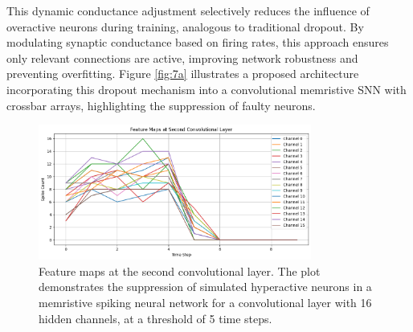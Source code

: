 
\noindent This dynamic conductance adjustment selectively reduces the influence of overactive neurons during training, analogous to traditional dropout. By modulating synaptic conductance based on firing rates, this approach ensures only relevant connections are active, improving network robustness and preventing overfitting. Figure \ref{fig:7a} illustrates a proposed architecture incorporating this dropout mechanism into a convolutional memristive SNN with crossbar arrays, highlighting the suppression of faulty neurons.\\

\begin{figure}[!t]
    \centerline{\includegraphics[width=0.8\textwidth]{Chapter7/Figs/b.png}}
    \caption[Feature maps at the second convolutional layer.]{Feature maps at the second convolutional layer. The plot demonstrates the suppression of simulated hyperactive neurons in a memristive spiking neural network for a convolutional layer with 16 hidden channels, at a threshold of 5 time steps.}
    \label{fig:7b}
\end{figure}


